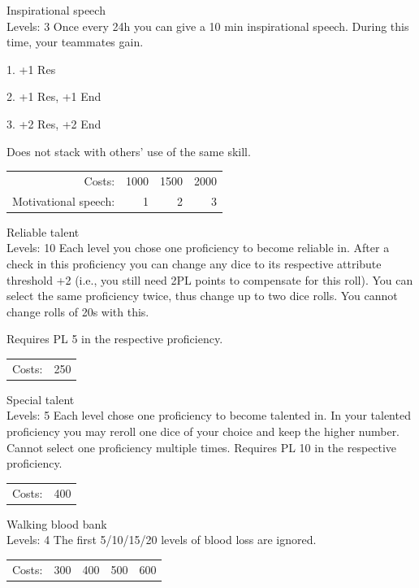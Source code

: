 \begin{skill}{Inspirational speech \\\phantom{a}\hfill Levels: 3}
	\setlength{\parskip}{8pt}
	\setlength{\parindent}{0pt}
	Once every 24h you can give a 10 min inspirational speech. During this time, your teammates gain.

	1. +1 Res

	2. +1 Res, +1 End

	3. +2 Res, +2 End

	Does not stack with others' use of the same skill.\\

	\hfill
	\begin{tabular}{rrrr}
		Costs: & 1000 & 1500 & 2000 \\
		Motivational speech: & 1 & 2 & 3 \\
	\end{tabular}
\end{skill}

\begin{skill}{Reliable talent \\\phantom{a}\hfill Levels: 10}
	\setlength{\parskip}{8pt}
	\setlength{\parindent}{0pt}
	Each level you chose one proficiency to become reliable in. After a check in this proficiency you can change any dice to its respective attribute threshold +2 (i.e., you still need 2PL points to compensate for this roll). You can select the same proficiency twice, thus change up to two dice rolls. You cannot change rolls of 20s with this.

	Requires PL 5 in the respective proficiency.\\

	\hfill
	\begin{tabular}{rr}
		Costs: & 250 \\
	\end{tabular}
\end{skill}

\begin{skill}{Special talent \\\phantom{a}\hfill Levels: 5}
	\setlength{\parskip}{8pt}
	\setlength{\parindent}{0pt}
	Each level chose one proficiency to become talented in. In your talented proficiency you may reroll one dice of your choice and keep the higher number. Cannot select one proficiency multiple times. Requires PL 10 in the respective proficiency.\\

	\hfill
	\begin{tabular}{rr}
		Costs: & 400 \\
	\end{tabular}
\end{skill}

\begin{skill}{Walking blood bank \\\phantom{a}\hfill Levels: 4}
	\setlength{\parskip}{8pt}
	\setlength{\parindent}{0pt}
	The first 5/10/15/20 levels of blood loss are ignored.\\

	\hfill
	\begin{tabular}{rrrrr}
		Costs: & 300 & 400 & 500 & 600 \\
	\end{tabular}
\end{skill}


